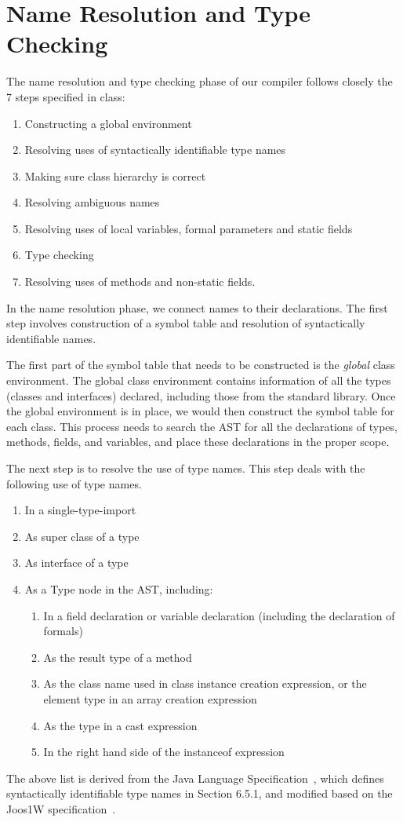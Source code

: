\documentclass[a4paper, notitlepage]{report}
\begin{document}
\section{Name Resolution and Type Checking}
\label{design_name}
The name resolution and type checking phase of our compiler follows closely the 7 steps specified in class:
\begin{enumerate}
	\item Constructing a global environment
	\item Resolving uses of syntactically identifiable type names
	\item Making sure class hierarchy is correct
	\item Resolving ambiguous names
	\item Resolving uses of local variables, formal parameters and static fields
	\item Type checking
	\item Resolving uses of methods and non-static fields.
\end{enumerate}

In the name resolution phase, we connect names to their declarations. The first step involves construction of a symbol table and resolution of syntactically identifiable names.

The first part of the symbol table that needs to be constructed is the \emph{global} class environment. The global class environment contains information of all the types (classes and interfaces) declared, including those from the standard library. Once the global environment is in place, we would then construct the symbol table for each class. This process needs to search the AST for all the declarations of types, methods, fields, and variables, and place these declarations in the proper scope.

The next step is to resolve the use of type names. This step deals with the following use of type names.
\begin{enumerate}
\item In a single-type-import
\item As super class of a type
\item As interface of a type
\item As a Type node in the AST, including:
	\begin{enumerate}
	\item In a field declaration or variable declaration (including the declaration of formals)
	\item As the result type of a method
	\item As the class name used in class instance creation expression, or the element type in an array creation expression
	\item As the type in a cast expression
	\item In the right hand side of the instanceof expression
	\end{enumerate}
\end{enumerate}
The above list is derived from the Java Language Specification~\cite{gosling2000java}, which defines syntactically identifiable type names in Section 6.5.1, and modified based on the Joos1W specification~\cite{joos1w}. 
\end{document}
